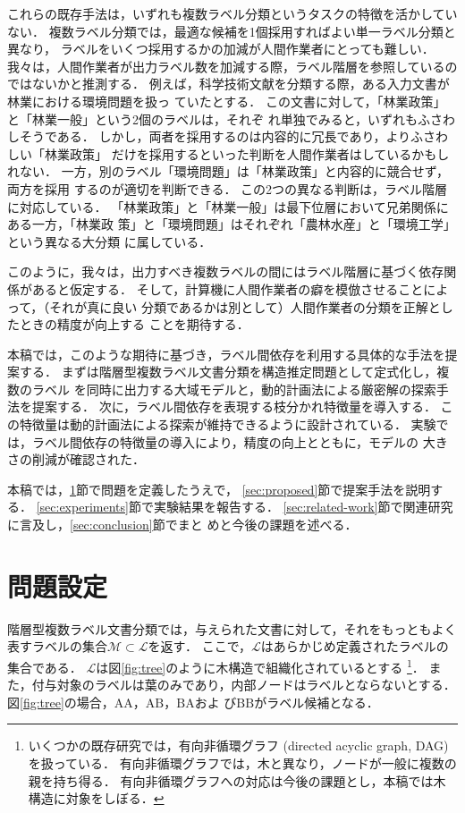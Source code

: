 \documentclass[japanese]{jnlp_1.4}
\begin{document}
これらの既存手法は，いずれも複数ラベル分類というタスクの特徴を活かしてい
ない．
複数ラベル分類では，最適な候補を1個採用すればよい単一ラベル分類と異なり，
ラベルをいくつ採用するかの加減が人間作業者にとっても難しい．
我々は，人間作業者が出力ラベル数を加減する際，ラベル階層を参照しているの
ではないかと推測する．
例えば，科学技術文献を分類する際，ある入力文書が林業における環境問題を扱っ
ていたとする．
この文書に対して，「林業政策」と「林業一般」という2個のラベルは，それぞ
れ単独でみると，いずれもふさわしそうである．
しかし，両者を採用するのは内容的に冗長であり，よりふさわしい「林業政策」
だけを採用するといった判断を人間作業者はしているかもしれない．
一方，別のラベル「環境問題」は「林業政策」と内容的に競合せず，両方を採用
するのが適切を判断できる．
この2つの異なる判断は，ラベル階層に対応している．
「林業政策」と「林業一般」は最下位層において兄弟関係にある一方，「林業政
策」と「環境問題」はそれぞれ「農林水産」と「環境工学」という異なる大分類
に属している．

このように，我々は，出力すべき複数ラベルの間にはラベル階層に基づく依存関
係があると仮定する．
そして，計算機に人間作業者の癖を模倣させることによって，（それが真に良い
分類であるかは別として）人間作業者の分類を正解としたときの精度が向上する
ことを期待する．

本稿では，このような期待に基づき，ラベル間依存を利用する具体的な手法を提
案する．
まずは階層型複数ラベル文書分類を構造推定問題として定式化し，複数のラベル
を同時に出力する大域モデルと，動的計画法による厳密解の探索手法を提案する．
次に，ラベル間依存を表現する枝分かれ特徴量を導入する．
この特徴量は動的計画法による探索が維持できるように設計されている．
実験では，ラベル間依存の特徴量の導入により，精度の向上とともに，モデルの
大きさの削減が確認された．

本稿では，\ref{sec:task}節で問題を定義したうえで，
\ref{sec:proposed}節で提案手法を説明する．
\ref{sec:experiments}節で実験結果を報告する．
\ref{sec:related-work}節で関連研究に言及し，\ref{sec:conclusion}節でまと
めと今後の課題を述べる．



\section{問題設定}
\label{sec:task}

階層型複数ラベル文書分類では，与えられた文書に対して，それをもっともよく
表すラベルの集合$\mathcal{M} \subset \mathcal{L}$を返す．
ここで，$\mathcal{L}$はあらかじめ定義されたラベルの集合である．
$\mathcal{L}$は図\ref{fig:tree}のように木構造で組織化されているとする
\footnote{
いくつかの既存研究では，有向非循環グラフ (directed acyclic graph, DAG)
を扱っている\cite{Labrou1999,LSHTC3}．
有向非循環グラフでは，木と異なり，ノードが一般に複数の親を持ち得る．
有向非循環グラフへの対応は今後の課題とし，本稿では木構造に対象をしぼる．}．
また，付与対象のラベルは葉のみであり，内部ノードはラベルとならないとする．
図\ref{fig:tree}の場合，$\mathrm{AA}$，$\mathrm{AB}$，$\mathrm{BA}$およ
び$\mathrm{BB}$がラベル候補となる．
\end{document}
